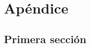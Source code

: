 
\pagestyle{fancy}
\fancyhead[LE,RO]{\thepage}
\fancyhead[LO]{\nouppercase{\rightmark}}

\chapter{Apéndice}

\minitoc

\section{Primera sección}


\chapterend
